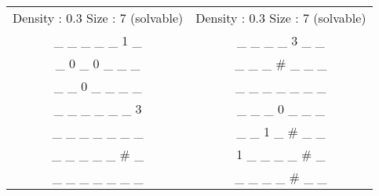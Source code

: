 \documentclass[a4paper]{article}
\begin{document}
\begin{tabular}{c c}


Density : 0.3 Size : 7 (solvable)& Density : 0.3 Size : 7 (solvable)  \\
\_ \_ \_ \_ \_  1 \_			& \_ \_ \_ \_ 3 \_ \_ 		\\
\_  0 \_  0 \_ \_ \_			& \_ \_ \_ \# \_ \_ \_		\\
\_ \_  0 \_ \_ \_ \_			& \_ \_ \_ \_ \_ \_ \_		\\
\_ \_ \_ \_ \_ \_  3			& \_ \_ \_  0 \_ \_ \_		\\
\_ \_ \_ \_ \_ \_ \_			& \_ \_  1 \_ \# \_ \_		\\
\_ \_ \_ \_ \_ \# \_			&  1 \_ \_ \_ \_ \# \_		\\
\_ \_ \_ \_ \_ \_ \_			& \_ \_ \_ \_ \# \_ \_		\\



\end{tabular}
\end{document}
